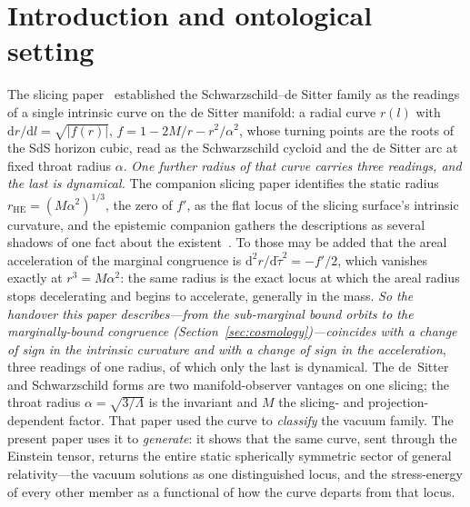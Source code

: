 \documentclass[11pt,a4paper]{article}
\theoremstyle{definition}
\newcommand{\dd}{\mathrm{d}}
\begin{document}
\section{Introduction and ontological setting}\label{sec:ontology}

The slicing paper~\cite{JanzenSlicing} established the Schwarzschild--de Sitter family as the readings of a single intrinsic curve on the de Sitter manifold: a radial curve $r(l)$ with $\dd r/\dd l=\sqrt{|f(r)|}$, $f=1-2M/r-r^{2}/\alpha^{2}$, whose turning points are the roots of the SdS horizon cubic, read as the Schwarzschild cycloid and the de Sitter arc at fixed throat radius $\alpha$. \emph{One further radius of that curve carries three readings, and the last is dynamical.} The
companion slicing paper identifies the static radius $r_{\mathrm{HE}}=(M\alpha^{2})^{1/3}$, the zero of $f'$, as the flat locus of the slicing surface's intrinsic curvature, and the
epistemic companion gathers the descriptions as several shadows of one fact about the
existent~\cite{JanzenSlicing, JanzenShadowExistence}. To those may be added that the areal acceleration of the
marginal congruence is $\dd^{2}r/\dd\tilde\tau^{2}=-f'/2$, which vanishes exactly at $r^{3}=M\alpha^{2}$: the
same radius is the exact locus at which the areal radius stops decelerating and begins to accelerate, generally
in the mass. \emph{So the handover this paper describes---from the sub-marginal bound orbits to the
marginally-bound congruence (Section~\ref{sec:cosmology})---coincides with a change of sign in the intrinsic curvature and with a change of sign in
the acceleration}, three readings of one radius, of which only the last is dynamical. The de~Sitter and Schwarzschild forms are two manifold-observer vantages on one slicing; the throat radius $\alpha=\sqrt{3/\Lambda}$ is the invariant and $M$ the slicing- and projection-dependent factor. That paper used the curve to \emph{classify} the vacuum family. The present paper uses it to \emph{generate}: it shows that the same curve, sent through the Einstein tensor, returns the entire static spherically symmetric sector of general relativity---the vacuum solutions as one distinguished locus, and the stress-energy of every other member as a functional of how the curve departs from that locus.
\end{document}
